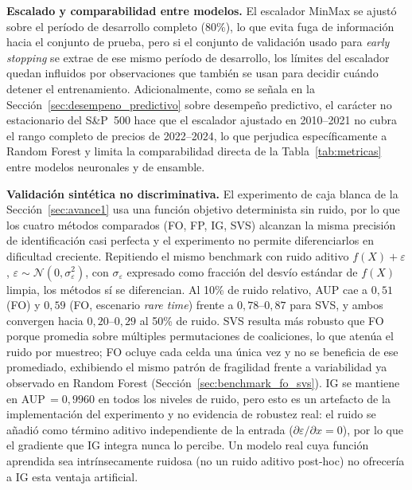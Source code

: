 \documentclass[conference, letterpaper]{IEEEtran}
\begin{document}
\textbf{Escalado y comparabilidad entre modelos.} El escalador
MinMax se ajustó sobre el período de desarrollo completo (80\%),
lo que evita fuga de información hacia el conjunto de prueba, pero
si el conjunto de validación usado para \textit{early stopping} se
extrae de ese mismo período de desarrollo, los límites del
escalador quedan influidos por observaciones que también se usan
para decidir cuándo detener el entrenamiento. Adicionalmente, como
se señala en la Sección~\ref{sec:desempeno_predictivo} sobre
desempeño predictivo, el carácter no estacionario del S\&P~500 hace
que el escalador ajustado en 2010--2021 no cubra el rango completo
de precios de 2022--2024, lo que perjudica específicamente a Random
Forest y limita la comparabilidad directa de la
Tabla~\ref{tab:metricas} entre modelos neuronales y de ensamble.

\textbf{Validación sintética no discriminativa.} El experimento de
caja blanca de la Sección~\ref{sec:avance1} usa una función objetivo
determinista sin ruido, por lo que los cuatro métodos comparados
(FO, FP, IG, SVS) alcanzan la misma precisión de identificación casi
perfecta y el experimento no permite diferenciarlos en dificultad
creciente. Repitiendo el mismo benchmark con ruido aditivo
$f(X)+\varepsilon$, $\varepsilon\sim\mathcal{N}(0,\sigma_\varepsilon^2)$,
con $\sigma_\varepsilon$ expresado como fracción del desvío estándar de
$f(X)$ limpia, los métodos sí se diferencian. Al 10\% de ruido
relativo, AUP cae a $0{,}51$ (FO) y $0{,}59$ (FO, escenario
\textit{rare time}) frente a $0{,}78$--$0{,}87$ para SVS, y ambos
convergen hacia $0{,}20$--$0{,}29$ al 50\% de ruido. SVS resulta más
robusto que FO porque promedia sobre múltiples permutaciones de
coaliciones, lo que atenúa el ruido por muestreo; FO ocluye cada
celda una única vez y no se beneficia de ese promediado, exhibiendo
el mismo patrón de fragilidad frente a variabilidad ya observado en
Random Forest (Sección~\ref{sec:benchmark_fo_svs}). IG se mantiene en
AUP\,$=0{,}9960$ en todos los niveles de ruido, pero esto es un
artefacto de la implementación del experimento y no evidencia de
robustez real: el ruido se añadió como término aditivo independiente
de la entrada ($\partial\varepsilon/\partial x = 0$), por lo que el
gradiente que IG integra nunca lo percibe. Un modelo real cuya
función aprendida sea intrínsecamente ruidosa (no un ruido aditivo
post-hoc) no ofrecería a IG esta ventaja artificial.
\end{document}
